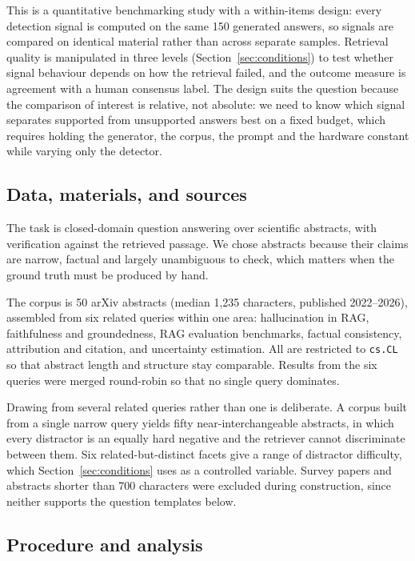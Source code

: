 \documentclass[11pt,a4paper]{article}
\begin{document}
This is a quantitative benchmarking study with a within-items design: every
detection signal is computed on the same 150 generated answers, so signals are
compared on identical material rather than across separate samples. Retrieval
quality is manipulated in three levels (Section~\ref{sec:conditions}) to test
whether signal behaviour depends on how the retrieval failed, and the outcome
measure is agreement with a human consensus label. The design suits the question
because the comparison of interest is relative, not absolute: we need to know
which signal separates supported from unsupported answers best on a fixed budget,
which requires holding the generator, the corpus, the prompt and the hardware
constant while varying only the detector.


\subsection{Data, materials, and sources}

The task is closed-domain question answering over scientific abstracts, with
verification against the retrieved passage. We chose abstracts because their
claims are narrow, factual and largely unambiguous to check, which matters when
the ground truth must be produced by hand.

The corpus is 50 arXiv abstracts (median 1{,}235 characters, published
2022--2026), assembled from six related queries within one area: hallucination
in RAG, faithfulness and groundedness, RAG evaluation benchmarks, factual
consistency, attribution and citation, and uncertainty estimation. All are
restricted to \texttt{cs.CL} so that abstract length and structure stay
comparable. Results from the six queries were merged round-robin so that no
single query dominates.

Drawing from several related queries rather than one is deliberate. A corpus
built from a single narrow query yields fifty near-interchangeable abstracts, in
which every distractor is an equally hard negative and the retriever cannot
discriminate between them. Six related-but-distinct facets give a range of
distractor difficulty, which Section~\ref{sec:conditions} uses as a controlled
variable. Survey papers and abstracts shorter than 700 characters were excluded
during construction, since neither supports the question templates below.

\subsection{Procedure and analysis}
\end{document}
